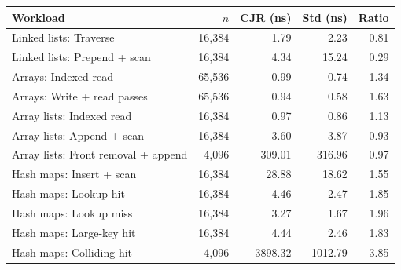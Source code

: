 \begin{tabular}{@{}lrrrr@{}}
\hline
Workload & $n$ & CJR (ns) & Std (ns) & Ratio \\
\hline
Linked lists: Traverse & 16,384 & 1.79 & 2.23 & 0.81 \\
Linked lists: Prepend + scan & 16,384 & 4.34 & 15.24 & 0.29 \\
Arrays: Indexed read & 65,536 & 0.99 & 0.74 & 1.34 \\
Arrays: Write + read passes & 65,536 & 0.94 & 0.58 & 1.63 \\
Array lists: Indexed read & 16,384 & 0.97 & 0.86 & 1.13 \\
Array lists: Append + scan & 16,384 & 3.60 & 3.87 & 0.93 \\
Array lists: Front removal + append & 4,096 & 309.01 & 316.96 & 0.97 \\
Hash maps: Insert + scan & 16,384 & 28.88 & 18.62 & 1.55 \\
Hash maps: Lookup hit & 16,384 & 4.46 & 2.47 & 1.85 \\
Hash maps: Lookup miss & 16,384 & 3.27 & 1.67 & 1.96 \\
Hash maps: Large-key hit & 16,384 & 4.44 & 2.46 & 1.83 \\
Hash maps: Colliding hit & 4,096 & 3898.32 & 1012.79 & 3.85 \\
\hline
\end{tabular}
